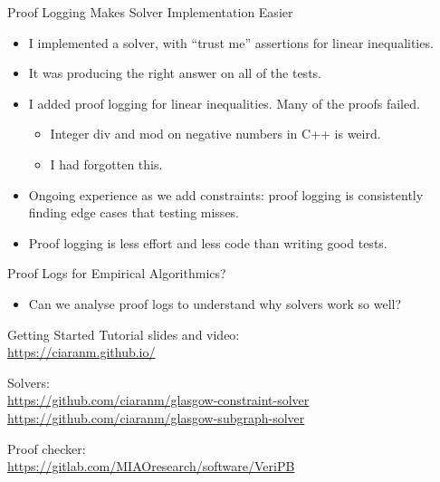 \documentclass[aspectratio=169,compress,10pt]{beamer}
\begin{document}
\begin{frame}{Proof Logging Makes Solver Implementation Easier}
    \begin{itemize}
        \item I implemented a solver, with ``trust me'' assertions for linear inequalities.
        \item It was producing the right answer on all of the tests.
        \item I added proof logging for linear inequalities. Many of the proofs failed.
            \begin{itemize}
                \item Integer div and mod on negative numbers in C++ is weird.
                \item I had forgotten this.
            \end{itemize}
        \item Ongoing experience as we add constraints: proof logging is consistently finding edge cases
            that testing misses.
        \item Proof logging is less effort and less code than writing good tests.
    \end{itemize}
\end{frame}

\begin{frame}{Proof Logs for Empirical Algorithmics?}
    \begin{itemize}
        \item Can we analyse proof logs to understand why solvers work so well?
    \end{itemize}
\end{frame}

\begin{frame}{Getting Started}
    Tutorial slides and video: \\
        \qquad\url{https://ciaranm.github.io/}

    \bigskip

    Solvers: \\
        \qquad\url{https://github.com/ciaranm/glasgow-constraint-solver} \\
        \qquad\url{https://github.com/ciaranm/glasgow-subgraph-solver}

    \bigskip

    Proof checker: \\
        \qquad\url{https://gitlab.com/MIAOresearch/software/VeriPB}
\end{frame}
\end{document}
